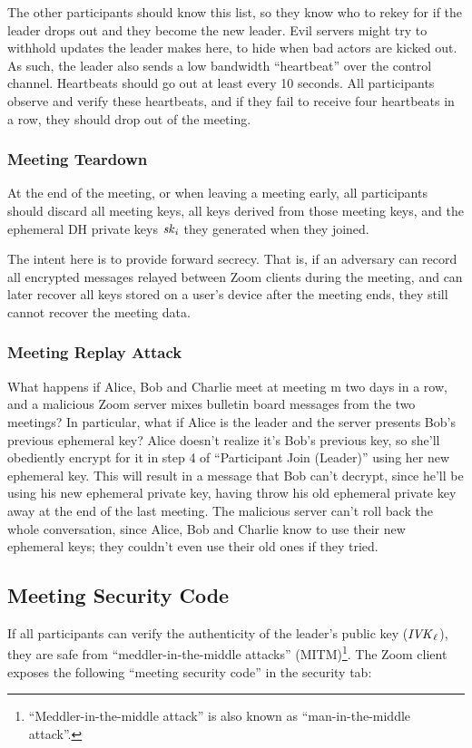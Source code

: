 The other participants should know this list, so they know who to rekey for if the leader drops out and they become the new leader. Evil servers might try to withhold updates the leader makes here, to hide when bad actors are kicked out. As such, the leader also sends a low bandwidth ``heartbeat'' over the control channel. Heartbeats should go out at least every 10 seconds. All participants observe and verify these heartbeats, and if they fail to receive four heartbeats in a row, they should drop out of the meeting.


\subsubsection{Meeting Teardown}
At the end of the meeting, or when leaving a meeting early, all participants should discard all meeting keys, all keys derived from those meeting keys, and the ephemeral DH private keys $\mathit{sk}_i$ they generated when they joined.

The intent here is to provide forward secrecy. That is, if an adversary can record all encrypted messages relayed between Zoom clients during the meeting, and can later recover all keys stored on a user's device after the meeting ends, they still cannot recover the meeting data.

\subsubsection{Meeting Replay Attack}

What happens if Alice, Bob and Charlie meet at meeting m two days in a row, and a malicious Zoom server mixes bulletin board messages from the two meetings? In particular, what if Alice is the leader and the server presents Bob's previous ephemeral key? Alice doesn't realize it's Bob's previous key, so she'll obediently encrypt for it in step 4 of ``Participant Join (Leader)'' using her new ephemeral key. This will result in a message that Bob can't decrypt, since he'll be using his new ephemeral private key, having throw his old ephemeral private key away at the end of the last meeting. The malicious server can't roll back the whole conversation, since Alice, Bob and Charlie know to use their new ephemeral keys; they couldn't even use their old ones if they tried.

\subsection{Meeting Security Code}
If all participants can verify the authenticity of the leader's public key ($\mathit{IVK}_{\ell}$), they are safe from ``meddler-in-the-middle attacks'' (MITM)\footnote{``Meddler-in-the-middle attack'' is also known as ``man-in-the-middle attack''.}. The Zoom client exposes the following ``meeting security code'' in the security tab:

